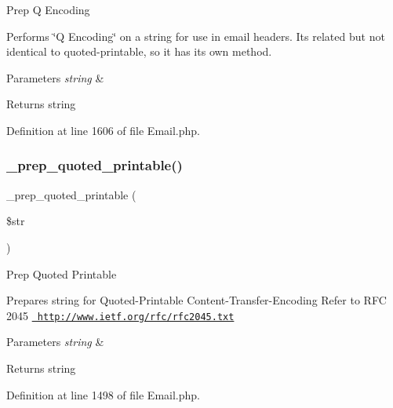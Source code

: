 Prep Q Encoding

Performs \char`\"{}\+Q Encoding\char`\"{} on a string for use in email headers. It\textquotesingle{}s related but not identical to quoted-\/printable, so it has its own method.


\begin{DoxyParams}{Parameters}
{\em string} & \\
\hline
\end{DoxyParams}
\begin{DoxyReturn}{Returns}
string 
\end{DoxyReturn}


Definition at line 1606 of file Email.\+php.

\mbox{\label{class_c_i___email_af2beda05a0ab5d0ec65b03da633b1d33}} 
\subsubsection{\texorpdfstring{\_prep\_quoted\_printable()}{\_prep\_quoted\_printable()}}
{\footnotesize\ttfamily \+\_\+prep\+\_\+quoted\+\_\+printable (\begin{DoxyParamCaption}\item[{}]{\$str }\end{DoxyParamCaption})\hspace{0.3cm}{\ttfamily [protected]}}

Prep Quoted Printable

Prepares string for Quoted-\/\+Printable Content-\/\+Transfer-\/\+Encoding Refer to R\+FC 2045 \href{http://www.ietf.org/rfc/rfc2045.txt}{\texttt{ http\+://www.\+ietf.\+org/rfc/rfc2045.\+txt}}


\begin{DoxyParams}{Parameters}
{\em string} & \\
\hline
\end{DoxyParams}
\begin{DoxyReturn}{Returns}
string 
\end{DoxyReturn}


Definition at line 1498 of file Email.\+php.

\mbox{\label{class_c_i___email_a3a624f07cca99fe6ab1b61dbec56eef8}} 
